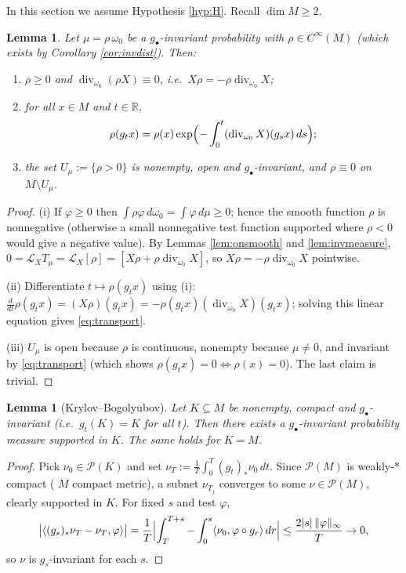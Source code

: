 \documentclass[11pt]{amsart}
\theoremstyle{plain}
\newtheorem{lemma}[theorem]{Lemma}
\theoremstyle{definition}
\theoremstyle{remark}
\newcommand{\R}{\mathbb{R}}
\newcommand{\Prob}{\mathcal{P}}
\newcommand{\Lx}{\mathcal{L}_X}
\begin{document}
In this section we assume Hypothesis \ref{hyp:H}. Recall $\dim M\ge2$.

\begin{lemma}\label{lem:density}
Let $\mu=\rho\,\omega_0$ be a $g_\bullet$-invariant probability with
$\rho\in C^\infty(M)$ (which exists by Corollary \ref{cor:invdist}).
Then:
\begin{enumerate}
\item[(i)] $\rho\ge 0$ and $\operatorname{div}_{\omega_0}(\rho X)\equiv0$,
i.e.\ $X\rho=-\rho\operatorname{div}_{\omega_0}X$;
\item[(ii)] for all $x\in M$ and $t\in\R$,
\begin{equation}\label{eq:transport}
\rho(g_tx)=\rho(x)\exp\Bigl(-\int_0^t
(\operatorname{div}_{\omega_0}X)(g_sx)\,ds\Bigr);
\end{equation}
\item[(iii)] the set $U_\mu:=\{\rho>0\}$ is nonempty, open and
$g_\bullet$-invariant, and $\rho\equiv 0$ on $M\setminus U_\mu$.
\end{enumerate}
\end{lemma}

\begin{proof}
(i) If $\varphi\ge0$ then $\int\rho\varphi\,d\omega_0=\int\varphi\,d\mu\ge0$;
hence the smooth function $\rho$ is nonnegative (otherwise a small
nonnegative test function supported where $\rho<0$ would give a negative
value). By Lemmas \ref{lem:onsmooth} and \ref{lem:invmeasure},
$0=\Lx T_\mu=\Lx[\rho]=[X\rho+\rho\operatorname{div}_{\omega_0}X]$, so
$X\rho=-\rho\operatorname{div}_{\omega_0}X$ pointwise.

(ii) Differentiate $t\mapsto\rho(g_tx)$ using (i):
$\frac d{dt}\rho(g_tx)=(X\rho)(g_tx)
=-\rho(g_tx)(\operatorname{div}_{\omega_0}X)(g_tx)$; solving this linear
equation gives \eqref{eq:transport}.

(iii) $U_\mu$ is open because $\rho$ is continuous, nonempty because
$\mu\neq0$, and invariant by \eqref{eq:transport} (which shows
$\rho(g_tx)=0\iff\rho(x)=0$). The last claim is trivial.
\end{proof}

\begin{lemma}[Krylov--Bogolyubov]\label{lem:KB}
Let $K\subseteq M$ be nonempty, compact and $g_\bullet$-invariant
(i.e.\ $g_t(K)=K$ for all $t$). Then there exists a
$g_\bullet$-invariant probability measure supported in $K$. The same
holds for $K=M$.
\end{lemma}

\begin{proof}
Pick $\nu_0\in\Prob(K)$ and set
$\nu_T:=\frac1T\int_0^T(g_t)_*\nu_0\,dt$. Since $\Prob(M)$ is weakly-$*$
compact ( $M$ compact metric), a subnet $\nu_{T_j}$ converges to some
$\nu\in\Prob(M)$, clearly supported in $K$. For fixed $s$ and test
$\varphi$,
\[
\bigl|\langle (g_s)_*\nu_T-\nu_T,\varphi\rangle\bigr|
=\frac1T\Bigl|\int_T^{T+s}-\int_0^{s}\langle\nu_0,\varphi\circ g_r\rangle\,dr\Bigr|
\le \frac{2|s|\,\|\varphi\|_\infty}{T}\to 0,
\]
so $\nu$ is $g_s$-invariant for each $s$.
\end{proof}
\end{document}
